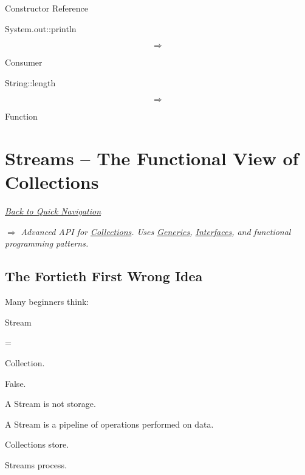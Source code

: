 \documentclass[11pt,a4paper]{book}
\begin{document}
Constructor Reference


System.out::println

\[
\Rightarrow
\]

Consumer


String::length

\[
\Rightarrow
\]

Function
\chapter{Streams -- The Functional View of Collections}

\smallskip
\noindent
\hyperref[sec:quick_nav]{\emph{Back to Quick Navigation}}

\smallskip
\noindent
\textcolor{RosettaRoyalPurple}{$\Rightarrow$}
\emph{Advanced API for \hyperref[chap:collections]{Collections}. Uses \hyperref[chap:generics]{Generics}, \hyperref[chap:interfaces]{Interfaces}, and functional programming patterns.}


\section{The Fortieth First Wrong Idea}

\begin{trap}

Many beginners think:


Stream

=

Collection.


False.


A Stream is not storage.


A Stream is a pipeline of
operations performed on data.


Collections store.


Streams process.

\end{trap}
\end{document}
